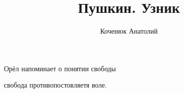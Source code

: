 \documentclass[12pt,a4paper]{article}
\author{Коченюк Анатолий}
\title{Пушкин. Узник}
\begin{document}
 
 Орёл напоминает о понятии свободы
 
 свобода противопостовляетя воле.
 
 
\end{document}
